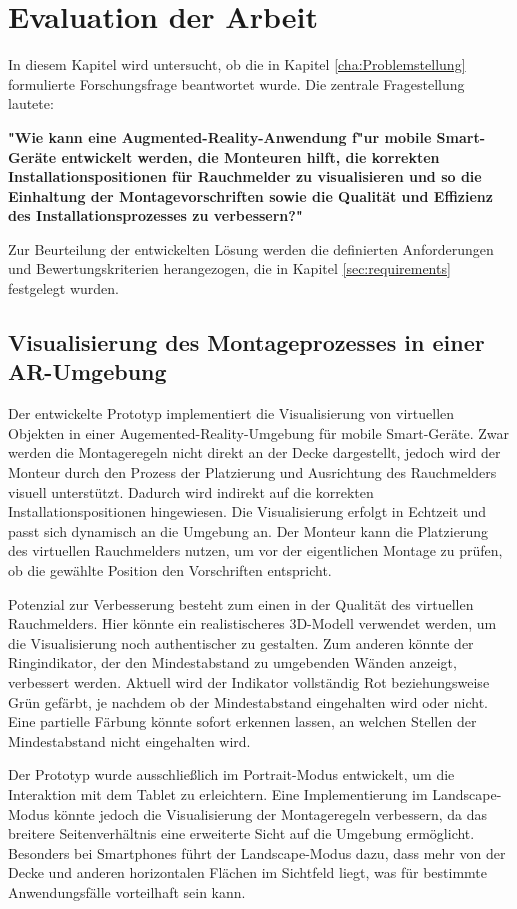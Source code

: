 \chapter{Evaluation der Arbeit}

In diesem Kapitel wird untersucht, ob die in Kapitel \ref{cha:Problemstellung} formulierte Forschungsfrage beantwortet wurde. Die zentrale Fragestellung lautete:

\textbf{"Wie kann eine Augmented-Reality-Anwendung f"ur mobile Smart-Geräte entwickelt werden, die Monteuren hilft, die korrekten Installationspositionen für Rauchmelder zu visualisieren und so die Einhaltung der Montagevorschriften sowie die Qualität und Effizienz des Installationsprozesses zu verbessern?"}

Zur Beurteilung der entwickelten Lösung werden die definierten Anforderungen und Bewertungskriterien herangezogen, die in Kapitel \ref{sec:requirements} festgelegt wurden.

\section{Visualisierung des Montageprozesses in einer AR-Umgebung}

Der entwickelte Prototyp implementiert die Visualisierung von virtuellen Objekten in einer Augemented-Reality-Umgebung für mobile Smart-Geräte. Zwar werden die Montageregeln nicht direkt an der Decke dargestellt, jedoch wird der Monteur durch den Prozess der Platzierung und Ausrichtung des Rauchmelders visuell unterstützt. Dadurch wird indirekt auf die korrekten Installationspositionen hingewiesen. Die Visualisierung erfolgt in Echtzeit und passt sich dynamisch an die Umgebung an. Der Monteur kann die Platzierung des virtuellen Rauchmelders nutzen, um vor der eigentlichen Montage zu prüfen, ob die gewählte Position den Vorschriften entspricht.

Potenzial zur Verbesserung besteht zum einen in der Qualität des virtuellen Rauchmelders. Hier könnte ein realistischeres 3D-Modell verwendet werden, um die Visualisierung noch authentischer zu gestalten. Zum anderen könnte der Ringindikator, der den Mindestabstand zu umgebenden Wänden anzeigt, verbessert werden. Aktuell wird der Indikator vollständig Rot beziehungsweise Grün gefärbt, je nachdem ob der Mindestabstand eingehalten wird oder nicht. Eine partielle Färbung könnte sofort erkennen lassen, an welchen Stellen der Mindestabstand nicht eingehalten wird.

Der Prototyp wurde ausschließlich im Portrait-Modus entwickelt, um die Interaktion mit dem Tablet zu erleichtern. Eine Implementierung im Landscape-Modus könnte jedoch die Visualisierung der Montageregeln verbessern, da das breitere Seitenverhältnis eine erweiterte Sicht auf die Umgebung ermöglicht. Besonders bei Smartphones führt der Landscape-Modus dazu, dass mehr von der Decke und anderen horizontalen Flächen im Sichtfeld liegt, was für bestimmte Anwendungsfälle vorteilhaft sein kann.


